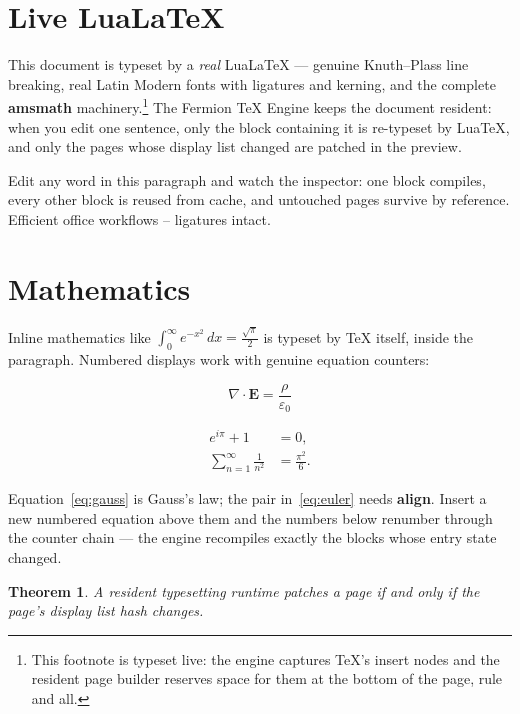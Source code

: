 \documentclass{article}
\newtheorem{theorem}{Theorem}[section]
\newcommand{\term}[1]{\textbf{#1}}
\newcommand{\engine}{Fermion TeX Engine}
\begin{document}
\tableofcontents

\section{Live LuaLaTeX}
\label{sec:live}

This document is typeset by a \emph{real} Lua\LaTeX{} --- genuine
Knuth--Plass line breaking, real Latin Modern fonts with ligatures and
kerning, and the complete \term{amsmath} machinery.\footnote{This footnote is typeset live: the engine captures
TeX's insert nodes and the resident page builder reserves space for them
at the bottom of the page, rule and all.} The \engine{} keeps
the document resident: when you edit one sentence, only the block
containing it is re-typeset by LuaTeX, and only the pages whose display
list changed are patched in the preview.

Edit any word in this paragraph and watch the inspector: one block
compiles, every other block is reused from cache, and untouched pages
survive by reference. Efficient office workflows -- ligatures intact.

\section{Mathematics}
\label{sec:math}

Inline mathematics like $\int_0^\infty e^{-x^2}\,dx = \frac{\sqrt{\pi}}{2}$
is typeset by TeX itself, inside the paragraph. Numbered displays work
with genuine equation counters:

\begin{equation}
  \label{eq:gauss}
  \nabla \cdot \mathbf{E} = \frac{\rho}{\varepsilon_0}
\end{equation}

\begin{align}
  \label{eq:euler}
  e^{i\pi} + 1 &= 0, \\
  \sum_{n=1}^{\infty} \frac{1}{n^2} &= \frac{\pi^2}{6}.
\end{align}

Equation~\eqref{eq:gauss} is Gauss's law; the pair in~\eqref{eq:euler}
needs \term{align}. Insert a new numbered equation above them and the
numbers below renumber through the counter chain --- the engine
recompiles exactly the blocks whose entry state changed.

\begin{theorem}
  \label{thm:main}
  A resident typesetting runtime patches a page if and only if the
  page's display list hash changes.
\end{theorem}
\end{document}
